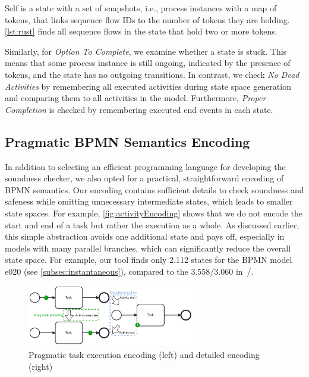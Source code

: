 \documentclass[runningheads]{llncs}
\begin{document}
\renewcommand\thelstlisting{\arabic{lstlisting}} %


\textsf{Self} is a state with a set of \textsf{snapshots}, i.e., process instances with a map of \textsf{tokens}, that links sequence flow IDs to the number of tokens they are holding.
\autoref{lst:rust} finds all sequence flows in the state that hold two or more tokens.

Similarly, for \textit{Option To Complete}, we examine whether a state is stuck.
This means that some process instance is still ongoing, indicated by the presence of tokens, and the state has no outgoing transitions.
In contrast, we check \textit{No Dead Activities} by remembering all executed activities during state space generation and comparing them to all activities in the model. 
Furthermore, \textit{Proper Completion} is checked by remembering executed end events in each state.


\subsection{Pragmatic BPMN Semantics Encoding}
In addition to selecting an efficient programming language for developing the soundness checker, we also opted for a practical, straightforward encoding of BPMN semantics.
Our encoding contains sufficient details to check soundness and safeness while omitting unnecessary intermediate states, which leads to smaller state spaces.
For example, \autoref{fig:activityEncoding} shows that we do not encode the start and end of a task but rather the execution as a whole.
As discussed earlier, this simple abstraction avoids one additional state and pays off, especially in models with many parallel branches, which can significantly reduce the overall state space.
For example, our tool finds only 2.112 states for the BPMN model \textsf{e020} (see \autoref{subsec:instantaneous}), compared to the 3.558/3.060  in~\cite{houhouFirstOrderLogicVerification2022}/\cite{krauterFormalizationAnalysisBPMN2023}.

\begin{figure}[ht]
	\centering
	\includegraphics[width=0.65\textwidth]{images/pragmatic-encoding}
	\caption{Pragmatic task execution encoding (left) and detailed encoding (right)}
	\label{fig:activityEncoding}
\end{figure}
\end{document}
